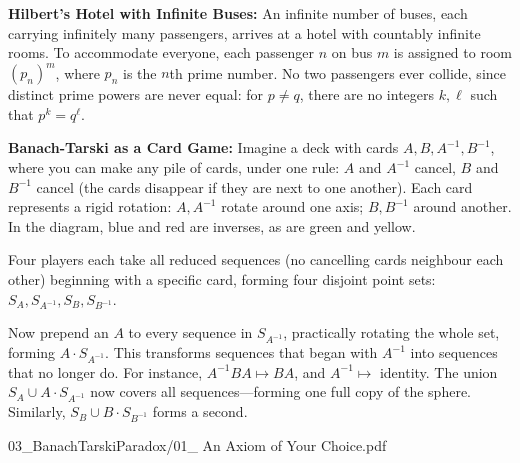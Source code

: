 \begin{SideNotePage}{
  \textbf{Hilbert's Hotel with Infinite Buses:} An infinite number of buses, each carrying infinitely many passengers, arrives at a hotel with countably infinite rooms. To accommodate everyone, each passenger \(n\) on bus \(m\) is assigned to room \((p_n)^m\), where \(p_n\) is the \(n\)th prime number. No two passengers ever collide, since distinct prime powers are never equal: for \(p \ne q\), there are no integers \(k, \ell\) such that \(p^k = q^\ell\). \par

  \textbf{Banach-Tarski as a Card Game:} Imagine a deck with cards \(A, B, A^{-1}, B^{-1}\), where you can make any pile of cards, under one rule: $A$ and $A^{-1}$ cancel, $B$ and $B^{-1}$ cancel (the cards disappear if they are next to one another). Each card represents a rigid rotation: \(A, A^{-1}\) rotate around one axis; \(B, B^{-1}\) around another. In the diagram, blue and red are inverses, as are green and yellow.

  Four players each take all reduced sequences (no cancelling cards neighbour each other) beginning with a specific card, forming four disjoint point sets: \(S_A, S_{A^{-1}}, S_B, S_{B^{-1}}\).

  Now prepend an \(A\) to every sequence in \(S_{A^{-1}}\), practically rotating the whole set, forming \(A \cdot S_{A^{-1}}\). This transforms sequences that began with \(A^{-1}\) into sequences that no longer do. For instance, \(A^{-1}BA \mapsto BA\), and \(A^{-1} \mapsto\) identity. The union \(S_A \cup A \cdot S_{A^{-1}}\) now covers all sequences—forming one full copy of the sphere. Similarly, \(S_B \cup B \cdot S_{B^{-1}}\) forms a second. \par
}{03_BanachTarskiParadox/01_ An Axiom of Your Choice.pdf}
\end{SideNotePage}
